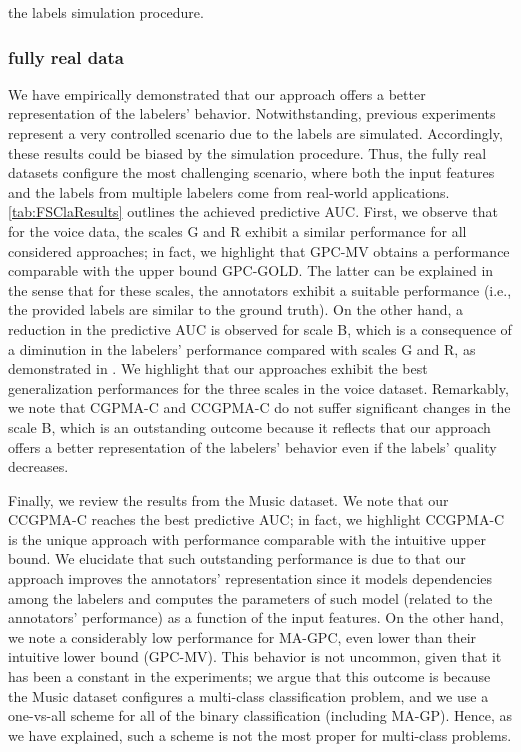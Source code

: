 \documentclass[journal]{IEEEtran}
\begin{document}
the labels simulation procedure.   

\subsubsection{fully real data}
We have empirically demonstrated that our approach offers a better representation of the labelers’ behavior. Notwithstanding, previous experiments represent a very controlled scenario due to the labels are simulated. Accordingly, these results could be biased by the simulation procedure. Thus, the fully real datasets configure the most challenging scenario, where both the input features and the labels from multiple labelers come from real-world applications.\\
\cref{tab:FSClaResults} outlines the achieved predictive AUC. First, we observe that for the voice data, the scales G and R exhibit a similar performance for all considered approaches; in fact, we highlight that GPC-MV obtains a performance comparable with the upper bound GPC-GOLD. The latter can be explained in the sense that for these scales, the annotators exhibit a suitable performance (i.e., the provided labels are similar to the ground truth). On the other hand, a reduction in the predictive AUC is observed for scale B, which is a consequence of a diminution in the labelers' performance compared with scales G and R, as demonstrated in \cite{gonzalez2015automatic}. We highlight that our approaches exhibit the best generalization performances for the three scales in the voice dataset. Remarkably, we note that CGPMA-C and CCGPMA-C do not suffer significant changes in the scale B, which is an outstanding outcome because it reflects that our approach offers a better representation of the labelers’ behavior even if the labels' quality decreases.

Finally, we review the results from the Music dataset. We note that our CCGPMA-C reaches the best predictive AUC; in fact, we highlight CCGPMA-C is the unique approach with performance comparable with the intuitive upper bound. We elucidate that such outstanding performance is due to that our approach improves the annotators' representation since it models dependencies among the labelers and computes the parameters of such model (related to the annotators' performance) as a function of the input features. On the other hand, we note a considerably low performance for MA-GPC, even lower than their intuitive lower bound (GPC-MV). This behavior is not uncommon, given that it has been a constant in the experiments; we argue that this outcome is because the Music dataset configures a multi-class classification problem, and we use a one-vs-all scheme for all of the binary classification (including MA-GP). Hence, as we have explained, such a scheme is not the most proper for multi-class problems.
\end{document}
